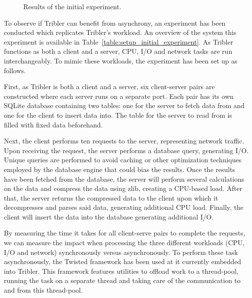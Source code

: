 \begin{figure}[h]
	\caption{Results of the initial experiment.}
	\label{fig:initial_results}
\end{figure}

To observe if Tribler can benefit from asynchrony, an experiment has been conducted which replicates Tribler's workload.
An overview of the system this experiment is available in Table~\ref{table:setup_initial_experiment}.
As Tribler functions as both a client and a server, CPU, I/O and network tasks are run interchangeably.
To mimic these workloads, the experiment has been set up as follows. 

First, as Tribler is both a client and a server, six client-server pairs are constructed where each server runs on a separate port.
Each pair has its own SQLite database containing two tables: one for the server to fetch data from and one for the client to insert data into. 
The table for the server to read from is filled with fixed data beforehand.

Next, the client performs ten requests to the server, representing network traffic.
Upon receiving the request, the server performs a database query, generating I/O.
Unique queries are performed to avoid caching or other optimization techniques employed by the database engine that could bias the results.
Once the results have been fetched from the database, the server will perform several calculations on the data and compress the data using zlib, creating a CPU-based load.
After that, the server returns the compressed data to the client upon which it decompresses and parses said data, generating additional CPU load.
Finally, the client will insert the data into the database generating additional I/O.

By measuring the time it takes for all client-serve pairs to complete the requests, we can measure the impact when processing the three different workloads (CPU, I/O and network) synchronously versus asynchronously.
To perform these task asynchronously, the Twisted framework has been used at it currently embedded into Tribler.
This framework features utilities to offload work to a thread-pool, running the task on a separate thread and taking care of the communication to and from this thread-pool.

